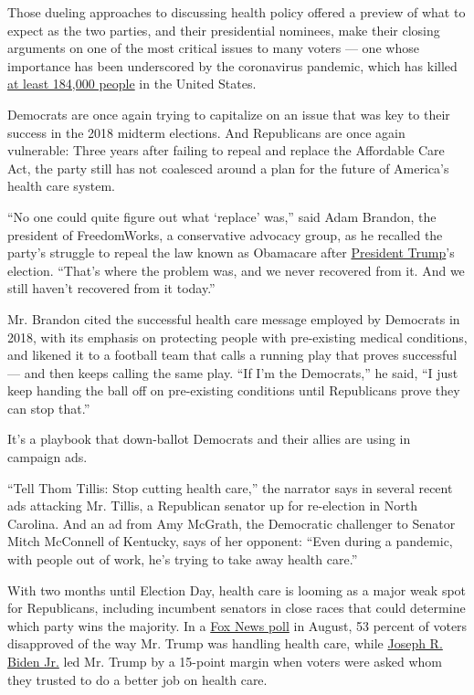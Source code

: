 Those dueling approaches to discussing health policy offered a preview
of what to expect as the two parties, and their presidential nominees,
make their closing arguments on one of the most critical issues to many
voters --- one whose importance has been underscored by the coronavirus
pandemic, which has killed
\href{https://www.nytimes3xbfgragh.onion/interactive/2020/us/coronavirus-us-cases.html}{at
least 184,000 people} in the United States.

Democrats are once again trying to capitalize on an issue that was key
to their success in the 2018 midterm elections. And Republicans are once
again vulnerable: Three years after failing to repeal and replace the
Affordable Care Act, the party still has not coalesced around a plan for
the future of America's health care system.

``No one could quite figure out what `replace' was,'' said Adam Brandon,
the president of FreedomWorks, a conservative advocacy group, as he
recalled the party's struggle to repeal the law known as Obamacare after
\href{https://www.nytimes3xbfgragh.onion/interactive/2020/us/elections/donald-trump.html}{President
Trump}'s election. ``That's where the problem was, and we never
recovered from it. And we still haven't recovered from it today.''

Mr. Brandon cited the successful health care message employed by
Democrats in 2018, with its emphasis on protecting people with
pre-existing medical conditions, and likened it to a football team that
calls a running play that proves successful --- and then keeps calling
the same play. ``If I'm the Democrats,'' he said, ``I just keep handing
the ball off on pre-existing conditions until Republicans prove they can
stop that.''

It's a playbook that down-ballot Democrats and their allies are using in
campaign ads.

``Tell Thom Tillis: Stop cutting health care,'' the narrator says in
several recent ads attacking Mr. Tillis, a Republican senator up for
re-election in North Carolina. And an ad from Amy McGrath, the
Democratic challenger to Senator Mitch McConnell of Kentucky, says of
her opponent: ``Even during a pandemic, with people out of work, he's
trying to take away health care.''

With two months until Election Day, health care is looming as a major
weak spot for Republicans, including incumbent senators in close races
that could determine which party wins the majority. In a
\href{https://static.foxnews.com/foxnews.com/content/uploads/2020/08/Fox_August-9-12-2020_Complete_National_Topline_August-13-Release.pdf}{Fox
News poll} in August, 53 percent of voters disapproved of the way Mr.
Trump was handling health care, while
\href{https://www.nytimes3xbfgragh.onion/interactive/2020/us/elections/joe-biden.html}{Joseph
R. Biden Jr.} led Mr. Trump by a 15-point margin when voters were asked
whom they trusted to do a better job on health care.

